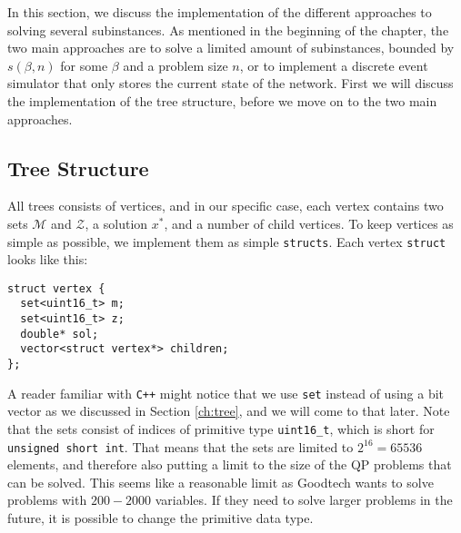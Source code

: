 In this section, we discuss the implementation of the different approaches to
solving several subinstances.
As mentioned in the beginning of the chapter, the two
main approaches are to solve a limited amount of subinstances, bounded
by $s(\beta, n)$ for some $\beta$ and a problem size $n$, or to implement a discrete
event simulator that only stores the current state of the network.
First we will discuss the implementation of the tree structure, before we
move on to the two main approaches.

\subsection{Tree Structure}
All trees consists of vertices, and in our specific case, each vertex contains
two sets $\mathcal{M}$ and $\mathcal{Z}$, a solution $x^*$, and a number of
child vertices. To keep vertices as simple as possible, we implement them as
simple \texttt{structs}. Each vertex \texttt{struct} looks like
this:
\begin{verbatim}
struct vertex {
  set<uint16_t> m;
  set<uint16_t> z;
  double* sol;
  vector<struct vertex*> children;
};
\end{verbatim}
A reader familiar with \texttt{C++} might notice that we use
\texttt{set} instead of using a bit vector as we discussed
in Section \ref{ch:tree}, and we will come to that later. Note that
the sets consist of indices of primitive type \texttt{uint16\_t}, which is
short for \texttt{unsigned short int}. That means that the sets are limited to
$2^{16} = 65536$ elements, and therefore also putting a limit to the size
of the QP problems that can be solved. This seems like a reasonable limit
as Goodtech wants to solve problems with $200 - 2000$ variables.
If they need to solve larger problems in the future, it is possible to change
the primitive data type.

